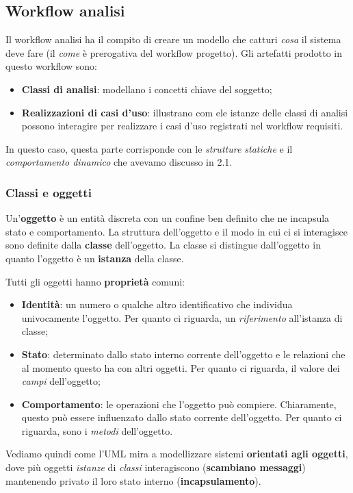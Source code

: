 \documentclass[a4paper,11pt]{article}
\begin{document}
\subsection{Workflow analisi}
Il workflow analisi ha il compito di creare un modello che catturi \textit{cosa} il sistema deve fare (il \textit{come} è prerogativa del workflow progetto).
Gli artefatti prodotto in questo workflow sono:
\begin{itemize}
	\item \textbf{Classi di analisi}: modellano i concetti chiave del soggetto;
	\item \textbf{Realizzazioni di casi d'uso}: illustrano com ele istanze delle classi di analisi possono interagire per realizzare i casi d'uso registrati nel workflow requisiti.
\end{itemize}

In questo caso, questa parte corrisponde con le \textit{strutture statiche} e il \textit{comportamento dinamico} che avevamo discusso in 2.1.

\subsubsection{Classi e oggetti}
Un'\textbf{oggetto} è un entità discreta con un confine ben definito che ne incapsula stato e comportamento.
La struttura dell'oggetto e il modo	in cui ci si interagisce sono definite dalla \textbf{classe} dell'oggetto.
La classe si distingue dall'oggetto in quanto l'oggetto è un \textbf{istanza} della classe.

Tutti gli oggetti hanno \textbf{proprietà} comuni:
\begin{itemize}
	\item \textbf{Identità}: un numero o qualche altro identificativo che individua univocamente l'oggetto. Per quanto ci riguarda, un \textit{riferimento} all'istanza di classe;
	\item \textbf{Stato}: determinato dallo stato interno corrente dell'oggetto e le relazioni che al momento questo ha con altri oggetti. Per quanto ci riguarda, il valore dei \textit{campi} dell'oggetto;
	\item \textbf{Comportamento}: le operazioni che l'oggetto può compiere. Chiaramente, questo può essere influenzato dallo stato corrente dell'oggetto. Per quanto ci riguarda, sono i \textit{metodi} dell'oggetto.
\end{itemize}

Vediamo quindi come l'UML mira a modellizzare sistemi \textbf{orientati agli oggetti}, dove più oggetti \textit{istanze} di \textit{classi} interagiscono (\textbf{scambiano messaggi}) mantenendo privato il loro stato interno (\textbf{incapsulamento}).
\end{document}
